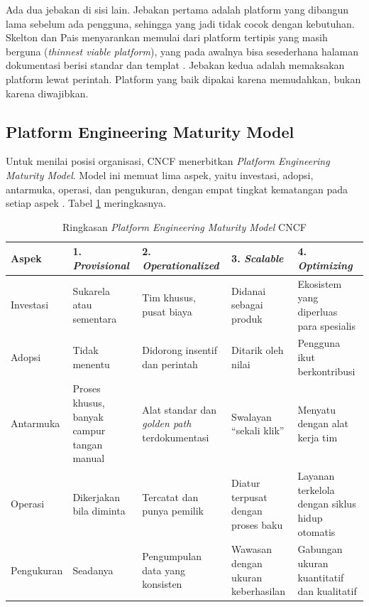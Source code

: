 Ada dua jebakan di sisi lain. Jebakan pertama adalah platform yang dibangun lama sebelum ada
pengguna, sehingga yang jadi tidak cocok dengan kebutuhan. Skelton dan Pais menyarankan memulai
dari platform tertipis yang masih berguna (\textit{thinnest viable platform}), yang pada awalnya
bisa sesederhana halaman dokumentasi berisi standar dan templat \cite{skelton2025}. Jebakan kedua
adalah memaksakan platform lewat perintah. Platform yang baik dipakai karena memudahkan, bukan
karena diwajibkan.

\subsection{Platform Engineering Maturity Model}

Untuk menilai posisi organisasi, CNCF menerbitkan \textit{Platform Engineering Maturity Model}.
Model ini memuat lima aspek, yaitu investasi, adopsi, antarmuka, operasi, dan pengukuran, dengan
empat tingkat kematangan pada setiap aspek \cite{c13-cncf-maturity}. Tabel
\ref{tab:ch13-maturity} meringkasnya.

\begin{table}[!htb]
  \centering
  \caption{Ringkasan \textit{Platform Engineering Maturity Model} CNCF
           \cite{c13-cncf-maturity}}
  \label{tab:ch13-maturity}
  \footnotesize
  \begin{tabularx}{\textwidth}{>{\raggedright\arraybackslash}p{1.8cm} >{\raggedright\arraybackslash}X >{\raggedright\arraybackslash}X >{\raggedright\arraybackslash}X >{\raggedright\arraybackslash}X}
    \hline
    \textbf{Aspek} & \textbf{1. \textit{Provisional}} & \textbf{2. \textit{Operationalized}} &
      \textbf{3. \textit{Scalable}} & \textbf{4. \textit{Optimizing}} \\ \hline
    Investasi & Sukarela atau sementara & Tim khusus, pusat biaya & Didanai sebagai produk &
      Ekosistem yang diperluas para spesialis \\ \hline
    Adopsi & Tidak menentu & Didorong insentif dan perintah & Ditarik oleh nilai & Pengguna ikut
      berkontribusi \\ \hline
    Antarmuka & Proses khusus, banyak campur tangan manual & Alat standar dan \textit{golden
      path} terdokumentasi & Swalayan ``sekali klik'' & Menyatu dengan alat kerja tim \\ \hline
    Operasi & Dikerjakan bila diminta & Tercatat dan punya pemilik & Diatur terpusat dengan
      proses baku & Layanan terkelola dengan siklus hidup otomatis \\ \hline
    Pengukuran & Seadanya & Pengumpulan data yang konsisten & Wawasan dengan ukuran keberhasilan
      & Gabungan ukuran kuantitatif dan kualitatif \\ \hline
  \end{tabularx}
\end{table}

